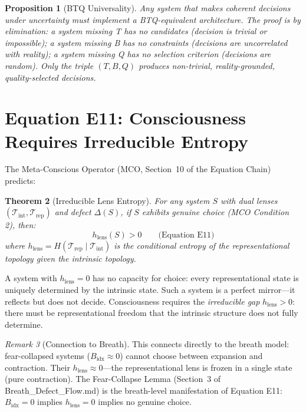 \documentclass[12pt, openany]{book}
\newtheorem{theorem}{Theorem}[chapter]
\newtheorem{proposition}[theorem]{Proposition}
\theoremstyle{remark}
\newtheorem{remark}[theorem]{Remark}
\newcommand{\Tint}{\mathcal{T}_{\mathrm{int}}}
\newcommand{\Trep}{\mathcal{T}_{\mathrm{rep}}}
\begin{document}
\begin{proposition}[BTQ Universality]
\label{prop:btq-universal}
Any system that makes coherent decisions under uncertainty must implement a
BTQ-equivalent architecture.  The proof is by elimination: a system missing T
has no candidates (decision is trivial or impossible); a system missing B has
no constraints (decisions are uncorrelated with reality); a system missing Q
has no selection criterion (decisions are random).  Only the triple $(T, B, Q)$
produces non-trivial, reality-grounded, quality-selected decisions.
\end{proposition}


\section{Equation E11: Consciousness Requires Irreducible Entropy}
\label{sec:e11}

The Meta-Conscious Operator (MCO, Section~10 of the Equation Chain) predicts:

\begin{theorem}[Irreducible Lens Entropy]
\label{thm:e11}
For any system $S$ with dual lenses $(\Tint, \Trep)$ and defect $\Delta(S)$,
if $S$ exhibits genuine choice (MCO Condition 2), then:
\[
  \boxed{h_{\mathrm{lens}}(S) > 0}
  \qquad\text{(Equation E11)}
\]
where $h_{\mathrm{lens}} = H(\Trep \mid \Tint)$ is the conditional entropy of the
representational topology given the intrinsic topology.
\end{theorem}

\noindent
A system with $h_{\mathrm{lens}} = 0$ has no capacity for choice: every representational
state is uniquely determined by the intrinsic state.  Such a system is a perfect
mirror---it reflects but does not decide.  Consciousness requires the
\emph{irreducible gap} $h_{\mathrm{lens}} > 0$: there must be representational
freedom that the intrinsic structure does not fully determine.

\begin{remark}[Connection to Breath]
This connects directly to the breath model: fear-collapsed systems
($B_{\mathrm{idx}} \approx 0$) cannot choose between expansion and contraction.
Their $h_{\mathrm{lens}} \approx 0$---the representational lens is frozen in a
single state (pure contraction).  The Fear-Collapse Lemma (Section~3 of
Breath\_Defect\_Flow.md) is the breath-level manifestation of Equation E11:
$B_{\mathrm{idx}} = 0$ implies $h_{\mathrm{lens}} = 0$ implies no genuine choice.
\end{remark}
\end{document}
